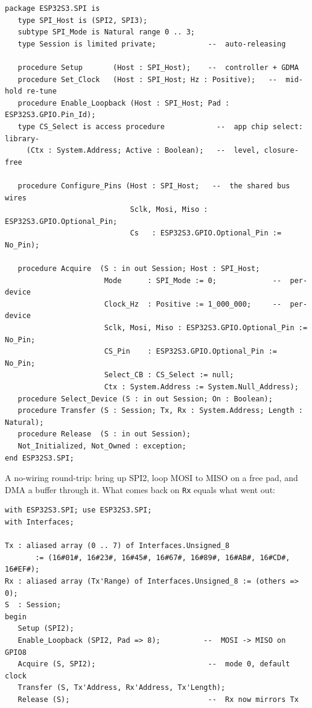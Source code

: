 \begin{lstlisting}
package ESP32S3.SPI is
   type SPI_Host is (SPI2, SPI3);
   subtype SPI_Mode is Natural range 0 .. 3;
   type Session is limited private;            --  auto-releasing

   procedure Setup       (Host : SPI_Host);    --  controller + GDMA
   procedure Set_Clock   (Host : SPI_Host; Hz : Positive);   --  mid-hold re-tune
   procedure Enable_Loopback (Host : SPI_Host; Pad : ESP32S3.GPIO.Pin_Id);
   type CS_Select is access procedure            --  app chip select: library-
     (Ctx : System.Address; Active : Boolean);   --  level, closure-free

   procedure Configure_Pins (Host : SPI_Host;   --  the shared bus wires
                             Sclk, Mosi, Miso : ESP32S3.GPIO.Optional_Pin;
                             Cs   : ESP32S3.GPIO.Optional_Pin := No_Pin);

   procedure Acquire  (S : in out Session; Host : SPI_Host;
                       Mode      : SPI_Mode := 0;             --  per-device
                       Clock_Hz  : Positive := 1_000_000;     --  per-device
                       Sclk, Mosi, Miso : ESP32S3.GPIO.Optional_Pin := No_Pin;
                       CS_Pin    : ESP32S3.GPIO.Optional_Pin := No_Pin;
                       Select_CB : CS_Select := null;
                       Ctx : System.Address := System.Null_Address);
   procedure Select_Device (S : in out Session; On : Boolean);
   procedure Transfer (S : Session; Tx, Rx : System.Address; Length : Natural);
   procedure Release  (S : in out Session);
   Not_Initialized, Not_Owned : exception;
end ESP32S3.SPI;
\end{lstlisting}

A no-wiring round-trip: bring up SPI2, loop MOSI to MISO on a free pad, and DMA
a buffer through it. What comes back on \texttt{Rx} equals what went out:

\begin{lstlisting}
with ESP32S3.SPI; use ESP32S3.SPI;
with Interfaces;

Tx : aliased array (0 .. 7) of Interfaces.Unsigned_8
       := (16#01#, 16#23#, 16#45#, 16#67#, 16#89#, 16#AB#, 16#CD#, 16#EF#);
Rx : aliased array (Tx'Range) of Interfaces.Unsigned_8 := (others => 0);
S  : Session;
begin
   Setup (SPI2);
   Enable_Loopback (SPI2, Pad => 8);          --  MOSI -> MISO on GPIO8
   Acquire (S, SPI2);                          --  mode 0, default clock
   Transfer (S, Tx'Address, Rx'Address, Tx'Length);
   Release (S);                                --  Rx now mirrors Tx
\end{lstlisting}


